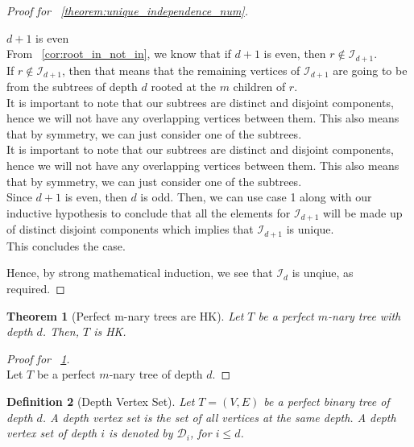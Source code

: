 \documentclass{amsart}
\newtheorem{theorem}{Theorem}[section]
\newtheorem{definition}[theorem]{Definition}
\theoremstyle{definition}
\begin{document}
\begin{proof}[Proof for ~\ref{theorem:unique_independence_num}]
\begin{caseof}
		\item $d + 1$ is even \\
		From ~\ref{cor:root_in_not_in}, we know that if $d + 1$ is even, then $r \not\in \mathcal{I}_{d + 1}$.
		\\
		If $r \not\in \mathcal{I}_{d + 1}$, then that means that the remaining vertices of $\mathcal{I}_{d+1}$ are going to be from the subtrees of depth $d$ rooted at the $m$ children of $r$.
		\\
		It is important to note that our subtrees are distinct and disjoint components, hence we will not have any overlapping vertices between them. This also means that by symmetry, we can just consider one of the subtrees.
		\\
		It is important to note that our subtrees are distinct and disjoint components, hence we will not have any overlapping vertices between them. This also means that by symmetry, we can just consider one of the subtrees.
		\\
		Since $d + 1$ is even, then $d$ is odd. Then, we can use case 1 along with our inductive hypothesis to conclude that all the elements for $\mathcal{I}_{d + 1}$ will be made up of distinct disjoint components which implies that $\mathcal{I}_{d+1}$ is unique.
		\\
		This concludes the case.
	\end{caseof}

	Hence, by strong mathematical induction, we see that $\mathcal{I}_{d}$ is unqiue, as required.
\end{proof}

\begin{theorem}[Perfect m-nary trees are HK]\label{theorem:mnary_hk}
	Let $T$ be a perfect $m$-nary tree with depth $d$. Then, $T$ is HK.
\end{theorem}

\begin{proof}[Proof for ~\ref{theorem:mnary_hk}]
	$ $ \\

	Let $T$ be a perfect $m$-nary tree of depth $d$.
\end{proof}


\begin{definition}[Depth Vertex Set]
	Let $T = (V, E)$ be a perfect binary tree of depth $d$. A depth vertex set is the set of all vertices at the same depth. A depth vertex set of depth $i$ is denoted by $\mathcal{D}_i$, for $i \leq d$.
\end{definition}
\end{document}
